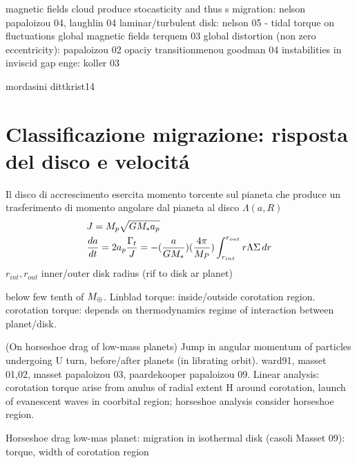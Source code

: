 \begin{workout}
magnetic fields cloud produce stocasticity and thus s migration: nelson papaloizou 04, laughlin 04
laminar/turbulent disk: nelson 05 - tidal torque on fluctuations
global magnetic fields terquem 03
global distortion (non zero eccentricity): papaloizou 02
opaciy transitionmenou goodman 04
instabilities in inviscid gap enge: koller 03
\end{workout}

\begin{workout}
mordasini dittkrist14
\end{workout}

\section{Classificazione migrazione: risposta del disco e velocit\'a}

Il disco di accrescimento esercita momento torcente sul pianeta che produce un trasferimento di momento angolare dal pianeta al disco $\Lambda(a,R)$
\begin{align*}
&J=M_p\sqrt{GM_*a_p}\\
&\TDy{t}{a}=2a_p\frac{\Gamma_t}{J}=-(\frac{a}{GM_*})(\frac{4\pi}{M_P})\int_{r_{int}}^{r_{out}}r\Lambda\Sigma\,dr
\end{align*}
$r_{int}, r_{out}$ inner/outer disk radius (rif to disk ar planet)


\begin{workout}[M14:type I]
below few tenth of $\mearth{}$.
Linblad torque: inside/outside corotation region.
corotation torque: depends on thermodynamics regime of interaction between planet/disk.
\end{workout}

\begin{workout}
(On horseshoe drag of low-mass planets)
Jump in angular momentum of particles undergoing U turn, before/after planets (in librating orbit).
ward91, masset 01,02, masset papaloizou 03, paardekooper papaloizou 09.
Linear analysis: corotation torque arise from anulus of radial extent H around corotation, launch of evanescent waves in coorbital region; horseshoe analysis consider horseshoe region.
\end{workout}

\begin{workout}
Horseshoe drag low-mas planet: migration in isothermal disk (casoli Masset 09): torque, width of corotation region
\end{workout}

